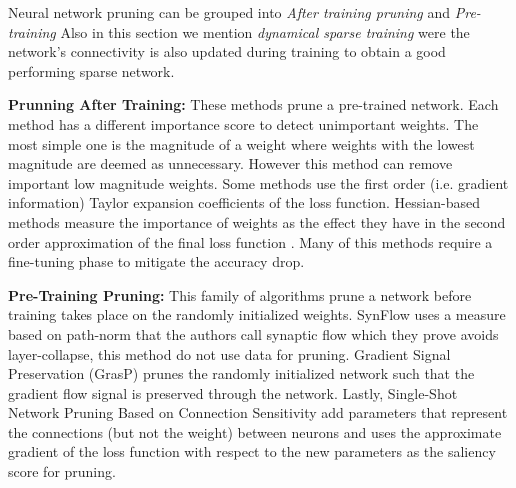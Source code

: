 
Neural network pruning can be grouped into \textit{After training pruning}
and  \textit{Pre-training } 
Also in this section we mention \textit{dynamical sparse training} were the
network's
connectivity  is also updated during training to obtain a good performing sparse network.

\textbf{Prunning After Training:} These methods prune a pre-trained network.
Each method has a different importance score to detect unimportant weights.
The most simple one is the magnitude of a weight
\cite{hanLearningBothWeights2015a,hanDeepCompressionCompressing2016a} where
weights with the lowest magnitude are deemed as
 unnecessary. However this method can remove important low magnitude weights.
 Some methods use the first order (i.e. gradient information) Taylor expansion
 coefficients of the loss function\cite{karninsimpleprocedurepruning1990a,mozerskeletonizationtechniquetrimming1988}.
 Hessian-based methods measure the importance of weights as the effect they
 have in the second order approximation of the final loss function 
 \cite{hassibiSecondOrderDerivatives1992,lecunOptimalBrainDamage1989,
 hassibiOptimalBrainSurgeon1993,singhWoodFisherEfficientSecondOrder2020}.
 Many of this methods require a fine-tuning phase to mitigate the accuracy
 drop.




\textbf{Pre-Training Pruning:} This family of algorithms prune a
network before training takes place on the randomly initialized weights. SynFlow
\cite{tanakaPruningNeuralNetworks2020a} uses a measure based on path-norm
\cite{neyshaburPathSGDPathNormalizedOptimization2015} that the authors call
synaptic flow which they prove avoids layer-collapse, this method do not use
data for pruning. Gradient Signal Preservation
(GrasP) \cite{wangPickingWinningTickets2020} prunes the randomly initialized network such that the
gradient flow signal is preserved through the network.
Lastly, Single-Shot Network Pruning Based on Connection Sensitivity
\cite{leeSNIPSINGLESHOTNETWORK2018} add parameters that represent the
connections (but not the weight) between neurons and uses the approximate
gradient of the loss function with respect to the new parameters as the
saliency score for pruning. 

